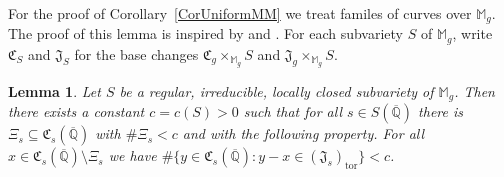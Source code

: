 \documentclass[12pt,oneside]{amsart}
\newcounter{maincounter}
\numberwithin{maincounter}{section}
\numberwithin{equation}{section}
\newtheorem{lemma}[maincounter]{Lemma}
\def\QQ{\mathbb{Q}}
\newcommand{\IQbar}{{\overline{\QQ}}}
\newcommand{\ssm}{\setminus}
\renewcommand{\subset}{\subseteq} %
\begin{document}
For the proof of Corollary~\ref{CorUniformMM} we treat familes of
curves over $\mathbb{M}_g$. The proof of this
lemma is inspired by \cite[Theorem~2.4]{Stoll:Uniform} and \cite[Proposition~7.1]{DGHUnifML}. For each subvariety $S$ of $\mathbb{M}_g$, write
$\mathfrak{C}_S$ and $\mathfrak{J}_S$ for the base changes
$\mathfrak{C}_g\times_{\mathbb{M}_g}S$ and
$\mathfrak{J}_g\times_{\mathbb{M}_g}S$.

\begin{lemma}\label{LemUML}
  Let $S$ be a regular, irreducible, locally closed subvariety of
  $\mathbb{M}_g$. Then there exists a constant $c = c(S) > 0$ such that
  for all $s\in S(\IQbar)$ there is $\Xi_s\subset
  \mathfrak{C}_s(\IQbar)$ with $\#\Xi_s < c$ and with the following
  property.
  For all $x\in \mathfrak{C}_s(\IQbar)\ssm \Xi_s$ we have
    $\#\{y \in \mathfrak{C}_s(\IQbar) : y-x \in (\mathfrak{J}_s)_{\mathrm{tor}} \} < c$.
\end{lemma}
\end{document}
